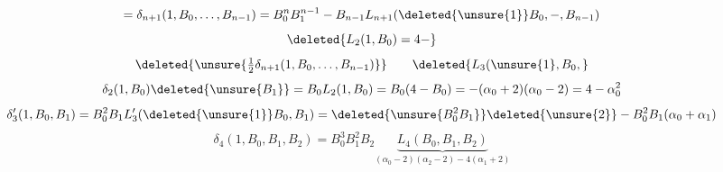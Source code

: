 \[
=\delta_{n+1}(1,B_0,\ldots,B_{n-1})
=B_0^nB_1^{n-1}\mathbin{-}B_{n-1}
L_{n+1}(\deleted{\unsure{1}}B_0,\mathbin{-},B_{n-1})
\]
\[
\deleted{L_2(1,B_0)=4-}
\]
\[
\deleted{\unsure{\tfrac12\delta_{n+1}(1,B_0,\ldots,B_{n-1})}}
\qquad
\deleted{L_3(\unsure{1},B_0,}
\]
\[
\delta_2(1,B_0)\deleted{\unsure{B_1}}
=B_0L_2(1,B_0)=B_0(4-B_0)
=-(\alpha_0+2)(\alpha_0-2)=4-\alpha_0^2
\]
\[
\delta'_3(1,B_0,B_1)
=B_0^2B_1L'_3(\deleted{\unsure{1}}B_0,B_1)
=\deleted{\unsure{B_0^2B_1}}\deleted{\unsure{2}}
-B_0^2B_1(\alpha_0+\alpha_1)
\]
\[
\delta_4(1,B_0,B_1,B_2)
=B_0^3B_1^2B_2
\underbrace{L_4(B_0,B_1,B_2)}_{(\alpha_0-2)(\alpha_2-2)-4(\alpha_1+2)}
\]
\margin{\[
\deleted{\begin{aligned}
\det\begin{pmatrix}2C_0&-C_1\\-C_1&2C_1\end{pmatrix}
&=4C_0C_1-C_1^2\\
&=C_1(4C_0-C_1)\\
&=B_0^2B_1(4-B_1)
\end{aligned}}
\]}

